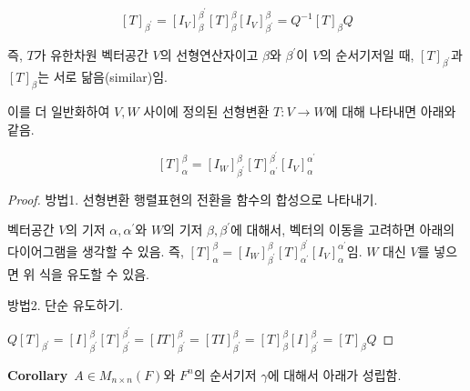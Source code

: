 \documentclass[10pt, a4paper]{article}
\begin{document}
\[
[T]_{\beta^{\prime}}=[I_V]_{\beta}^{\beta^\prime}[T]^{\beta}_{\beta}[I_V]_{\beta^{\prime}}^{\beta}=Q^{-1}[T]_{\beta}Q
\]

즉, $T$가 유한차원 벡터공간 $V$의 선형연산자이고 $\beta$와 $\beta^{\prime}$이 $V$의 순서기저일 때, $[T]_{\beta^{\prime}}$과 $[T]_{\beta}$는 서로 닮음(similar)임.

이를 더 일반화하여 $V,W$ 사이에 정의된 선형변환 $T:V \rightarrow W$에 대해 나타내면 아래와 같음.

\[
[T]_{\alpha}^{\beta}=[I_W]_{\beta^\prime}^{\beta}[T]_{\alpha^{\prime}}^{\beta^{\prime}}[I_V]_{\alpha}^{\alpha^{\prime}}
\]

\begin{proof}
방법1. 선형변환 행렬표현의 전환을 함수의 합성으로 나타내기.

벡터공간 $V$의 기저 $\alpha, \alpha^{\prime}$와 $W$의 기저 $\beta, \beta^{\prime}$에 대해서, 벡터의 이동을 고려하면 아래의 다이어그램을 생각할 수 있음. 즉, $[T]_{\alpha}^{\beta}=[I_W]_{\beta^\prime}^{\beta}[T]_{\alpha^{\prime}}^{\beta^{\prime}}[I_V]_{\alpha}^{\alpha^{\prime}}$임. $W$ 대신 $V$를 넣으면 위 식을 유도할 수 있음.


방법2. 단순 유도하기.

$Q[T]_{\beta^{\prime}}=[I]_{\beta^{\prime}}^{\beta}[T]_{\beta^{\prime}}^{\beta^{\prime}}=[IT]_{\beta^{\prime}}^{\beta}=[TI]_{\beta^{\prime}}^{\beta}=[T]_{\beta}^{\beta}[I]_{\beta^{\prime}}^{\beta}=[T]_{\beta}Q$
\end{proof}

\textbf{Corollary}\, $A \in M_{n \times n}(F)$와 $F^n$의 순서기저 $\gamma$에 대해서 아래가 성립함.
\end{document}

